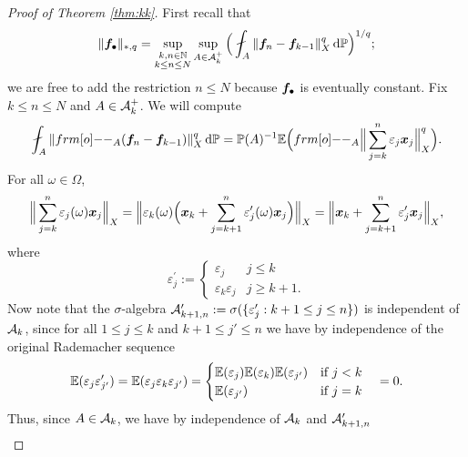 \begin{proof}[Proof of Theorem \ref{thm:kk}]
  First recall that
  \begin{equation*}
    \|\mb{f}_{\bullet}\|_{*,q} =  \sup_{\substack{k,n \in \N \\ k \leq n \leq N}} \sup_{A \in \mc{A}_k^{+}} \Big( \fint_{A} \|\mb{f}_n - \mb{f}_{k-1}\|_{X}^{q} \, \dd\P\Big)^{1/q};
  \end{equation*}
  we are free to add the restriction $n \leq N$ because $\bm{f}_{\bullet}$ is eventually constant.
  Fix $k \leq n \leq N$ and $A \in \mathcal{A}_k^{+}$.
  We will compute
  \begin{equation*}
    \fint_{A} \|\1_{A} (\mb{f}_n - \mb{f}_{k-1})\|_{X}^q \, \dd\P = \P(A)^{-1} \E \Big( \1_{A} \Big\| \sum_{j=k}^{n} \varepsilon_j \mb{x}_j\Big\|_{X}^q \Big).
  \end{equation*}
  For all $\omega \in \Omega$,
  \begin{equation*}
    \Big\| \sum_{j=k}^{n} \varepsilon_j(\omega) \bm{x}_j\Big\|_{X} = \Big\| \varepsilon_k(\omega) \Big( \bm{x}_k + \sum_{j=k+1}^{n} \varepsilon_{j}^{\prime}(\omega) \bm{x}_j \Big) \Big\|_{X} = \Big\|\bm{x}_k + \sum_{j=k+1}^{n} \varepsilon_{j}^{\prime} \bm{x}_j \Big\|_{X},
  \end{equation*}
  where
  \begin{equation*}
    \varepsilon_{j}^{\prime} :=
    \begin{cases}
      \varepsilon_{j} & j \leq k \\
      \varepsilon_{k} \varepsilon_{j} & j \geq k+1.
    \end{cases}
  \end{equation*}
  Now note that the $\sigma$-algebra $\mathcal{A}^\prime_{k+1,n} := \sigma(\{\varepsilon_j^\prime : k+1 \leq j \leq n\})$ is independent of $\mathcal{A}_k$, since for all $1 \leq j \leq k$ and $k+1 \leq j' \leq n$ we have by independence of the original Rademacher sequence
  \begin{equation*}
    \mathbb{E}(\varepsilon_j \varepsilon_{j'}^\prime) = \mathbb{E}(\varepsilon_j \varepsilon_k \varepsilon_{j'})
    =
    \begin{cases}
      \mathbb{E}(\varepsilon_j) \mathbb{E}(\varepsilon_k) \mathbb{E}(\varepsilon_{j'}) & \text{if $j < k$} \\
       \mathbb{E}(\varepsilon_{j'}) & \text{if $j = k$}
    \end{cases}
    \quad = 0.
  \end{equation*}
  Thus, since $A \in \mathcal{A}_k$, we have by independence of $\mathcal{A}_k$ and $\mathcal{A}^{\prime}_{k+1, n}$
  \begin{equation*}
    \begin{aligned}

\end{aligned}
\end{equation*}
\end{proof}
